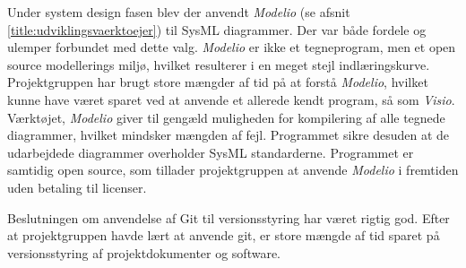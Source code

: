 Under system design fasen blev der anvendt \textit{Modelio} (se afsnit \ref{title:udviklingsvaerktoejer}) til SysML diagrammer. Der var både fordele og ulemper forbundet med dette valg. \textit{Modelio} er ikke et tegneprogram, men et open source modellerings miljø, hvilket resulterer i en meget stejl indlæringskurve. Projektgruppen har brugt store mængder af tid på at forstå \textit{Modelio}, hvilket kunne have været sparet ved at anvende et allerede kendt program, så som \textit{Visio}. Værktøjet, \textit{Modelio} giver til gengæld muligheden for kompilering af alle tegnede diagrammer, hvilket mindsker mængden af fejl. Programmet sikre desuden at de udarbejdede diagrammer overholder SysML standarderne. Programmet er samtidig open source, som tillader projektgruppen at anvende \textit{Modelio} i fremtiden uden betaling til licenser.

Beslutningen om anvendelse af Git til versionsstyring har været rigtig god. Efter at projektgruppen havde lært at anvende git, er store mængde af tid sparet på versionsstyring af projektdokumenter og software.


